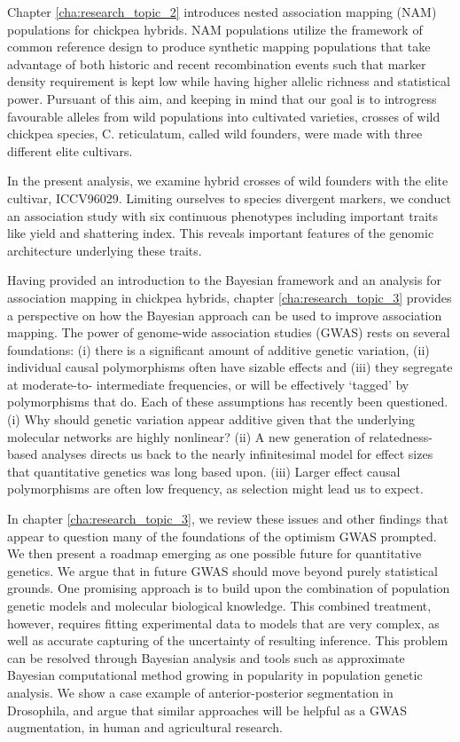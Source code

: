 Chapter \ref{cha:research_topic_2} introduces nested association mapping (NAM) populations for chickpea hybrids. NAM populations utilize the framework of common reference design to produce synthetic
mapping populations that take advantage of both historic and recent recombination events such
that marker density requirement is kept low while having higher allelic richness and statistical
power. Pursuant of this aim, and keeping in mind that our goal is to introgress favourable alleles
from wild populations into cultivated varieties, crosses of wild chickpea species, C. reticulatum, called wild founders, were made with three different elite cultivars.

In the present analysis, we examine hybrid crosses of wild founders with the elite cultivar,
ICCV96029. Limiting ourselves to species divergent markers, we conduct an association study
with six continuous phenotypes including important traits like yield and shattering index. This
reveals important features of the genomic architecture underlying these traits. 

Having provided an introduction to the Bayesian framework and an analysis for association mapping in chickpea hybrids, chapter \ref{cha:research_topic_3} provides a perspective on how the Bayesian approach can be used to improve association mapping. The power of genome-wide association studies (GWAS) rests on several foundations: (i) there is a significant amount of additive genetic variation, (ii) individual causal polymorphisms often have sizable effects and (iii) they segregate at moderate-to- intermediate frequencies, or will be effectively ‘tagged’ by polymorphisms that do. Each of these assumptions has recently been questioned. (i) Why should genetic variation appear additive given that the underlying molecular networks are highly nonlinear? (ii) A new generation of relatedness-based analyses directs us back to the nearly infinitesimal model for effect sizes that quantitative genetics was long based upon. (iii) Larger effect causal polymorphisms are often low frequency, as selection might lead us to expect. 

In chapter \ref{cha:research_topic_3}, we review these issues and other findings that appear to question many of the foundations of the optimism GWAS prompted. We then present a roadmap emerging as one possible future for quantitative genetics. We argue that in future GWAS should move beyond purely statistical grounds. One promising approach is to build upon the combination of population genetic models and molecular biological knowledge. This combined treatment, however, requires fitting experimental data to models that are very complex, as well as accurate capturing of the uncertainty of resulting inference. This problem can be resolved through Bayesian analysis and tools such as approximate Bayesian computational method growing in popularity in population genetic analysis. We show a case example of anterior-posterior segmentation in Drosophila, and argue that similar approaches will be helpful as a GWAS augmentation, in human and agricultural research.

